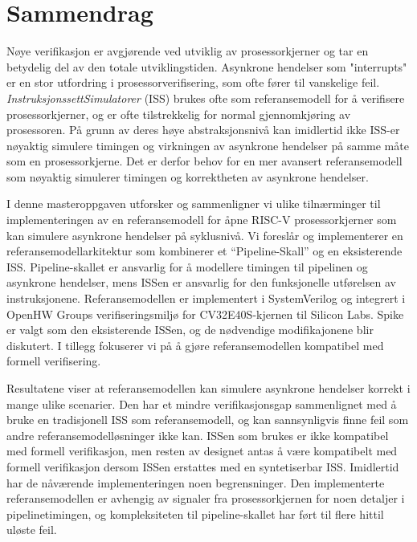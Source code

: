 \chapter*{Sammendrag}

Nøye verifikasjon er avgjørende ved utviklig av prosessorkjerner og tar en betydelig del av den totale utviklingstiden.
Asynkrone hendelser som "interrupts" er en stor utfordring i prosessorverifisering, som ofte fører til vanskelige feil. \textit{InstruksjonssettSimulatorer} (ISS) brukes ofte som referansemodell for å verifisere prosessorkjerner, og er ofte tilstrekkelig for normal gjennomkjøring av prosessoren. På grunn av deres høye abstraksjonsnivå kan imidlertid ikke ISS-er nøyaktig simulere timingen og virkningen av asynkrone hendelser på samme måte som en prosessor\-kjerne. Det er derfor behov for en mer avansert referansemodell som nøyaktig simulerer timingen og korrekt\-heten av asynkrone hendelser. 

I denne masteroppgaven utforsker og sammenligner vi ulike tilnærminger til implementeringen av en referansemodell for åpne RISC-V prosessorkjerner som kan simulere asynkrone hendelser på syklusnivå.  Vi foreslår og implementerer en referansemodellarkitektur som kombinerer et “Pipeline-Skall” og en eksisterende ISS. Pipeline-skallet er ansvarlig for å modellere timingen til pipelinen og asynkrone hendelser, mens ISSen er ansvarlig for den funksjonelle utførelsen av instruksjonene. Referansemodellen er implementert i SystemVerilog og integrert i OpenHW Groups verifiseringsmiljø for CV32E40S-kjernen til Silicon Labs. Spike er valgt som den eksisterende ISSen, og de nødvendige modifikajonene blir diskutert. I tillegg fokuserer vi på å gjøre referansemodellen kompatibel med formell verifisering.

Resultatene viser at referansemodellen kan simulere asynkrone hendelser korrekt i mange ulike scenarier. Den har et mindre verifikasjonsgap sammenlignet med å bruke en tradisjonell ISS som referansemodell, og kan sannsynligvis finne feil som andre referansemodelløsninger ikke kan. ISSen som brukes er ikke kompatibel med formell verifikasjon, men resten av designet antas å være kompatibelt med formell verifikasjon dersom ISSen erstattes med en syntetiserbar ISS. Imidlertid har de nåværende implementeringen noen begrensninger. Den implementerte referansemodellen er avhengig av signaler fra prosessorkjernen for noen detaljer i pipelinetimingen, og kompleksiteten til pipeline-skallet har ført til flere hittil uløste feil.


